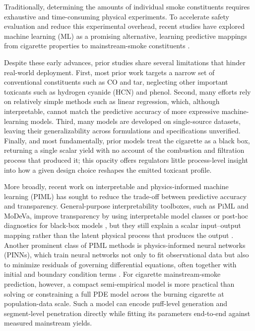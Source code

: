 \documentclass[11pt]{article}
\begin{document}
Traditionally, determining the amounts of individual smoke constituents requires exhaustive and time-consuming physical experiments. To accelerate safety evaluation and reduce this experimental overhead, recent studies have explored machine learning (ML) as a promising alternative, learning predictive mappings from cigarette properties to mainstream-smoke constituents \cite{yang2022demislim, he2023multifactor, wan2026homogeneity, Zhu2025transformer, Hannel2019AnAF}.

Despite these early advances, prior studies share several limitations that hinder real-world deployment. First, most prior work targets a narrow set of conventional constituents such as CO and tar, neglecting other important toxicants such as hydrogen cyanide (HCN) and phenol. Second, many efforts rely on relatively simple methods such as linear regression, which, although interpretable, cannot match the predictive accuracy of more expressive machine-learning models. Third, many models are developed on single-source datasets, leaving their generalizability across formulations and specifications unverified. Finally, and most fundamentally, prior models treat the cigarette as a black box, returning a single scalar yield with no account of the combustion and filtration process that produced it; this opacity offers regulators little process-level insight into how a given design choice reshapes the emitted toxicant profile.

More broadly, recent work on interpretable and physics-informed machine learning (PIML) has sought to reduce the trade-off between predictive accuracy and transparency. General-purpose interpretability toolboxes, such as PiML and MoDeVa, improve transparency by using interpretable model classes or post-hoc diagnostics for black-box models \cite{Rudin2019InterpretableModels, sudjianto2023piml, modeva_explain_docs}, but they still explain a scalar input--output mapping rather than the latent physical process that produces the output \cite{pmlr-v108-janzing20a, Molnar2022}. Another prominent class of PIML methods is physics-informed neural networks (PINNs), which train neural networks not only to fit observational data but also to minimize residuals of governing differential equations, often together with initial and boundary condition terms \cite{RAISSI2019686, Karniadakis2021PhysicsInformedML, Cuomo2022PINN}. For cigarette mainstream-smoke prediction, however, a compact semi-empirical model is more practical than solving or constraining a full PDE model across the burning cigarette at population-data scale. Such a model can encode puff-level generation and segment-level penetration directly while fitting its parameters end-to-end against measured mainstream yields.
\end{document}
